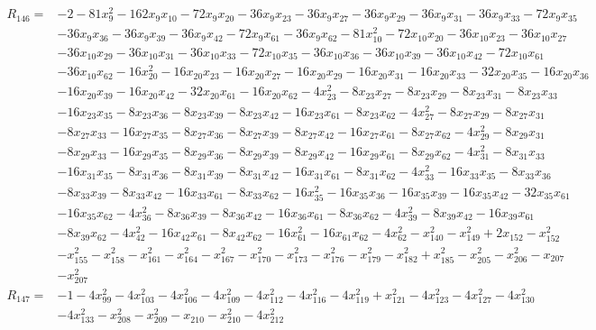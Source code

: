 \begin{align*}
R_{146}={}&-2-81x_{9}^{2}-162x_{9}x_{10}-72x_{9}x_{20}-36x_{9}x_{23}-36x_{9}x_{27}-36x_{9}x_{29}-36x_{9}x_{31}-36x_{9}x_{33}-72x_{9}x_{35}\\
{}&-36x_{9}x_{36}-36x_{9}x_{39}-36x_{9}x_{42}-72x_{9}x_{61}-36x_{9}x_{62}-81x_{10}^{2}-72x_{10}x_{20}-36x_{10}x_{23}-36x_{10}x_{27}\\
{}&-36x_{10}x_{29}-36x_{10}x_{31}-36x_{10}x_{33}-72x_{10}x_{35}-36x_{10}x_{36}-36x_{10}x_{39}-36x_{10}x_{42}-72x_{10}x_{61}\\
{}&-36x_{10}x_{62}-16x_{20}^{2}-16x_{20}x_{23}-16x_{20}x_{27}-16x_{20}x_{29}-16x_{20}x_{31}-16x_{20}x_{33}-32x_{20}x_{35}-16x_{20}x_{36}\\
{}&-16x_{20}x_{39}-16x_{20}x_{42}-32x_{20}x_{61}-16x_{20}x_{62}-4x_{23}^{2}-8x_{23}x_{27}-8x_{23}x_{29}-8x_{23}x_{31}-8x_{23}x_{33}\\
{}&-16x_{23}x_{35}-8x_{23}x_{36}-8x_{23}x_{39}-8x_{23}x_{42}-16x_{23}x_{61}-8x_{23}x_{62}-4x_{27}^{2}-8x_{27}x_{29}-8x_{27}x_{31}\\
{}&-8x_{27}x_{33}-16x_{27}x_{35}-8x_{27}x_{36}-8x_{27}x_{39}-8x_{27}x_{42}-16x_{27}x_{61}-8x_{27}x_{62}-4x_{29}^{2}-8x_{29}x_{31}\\
{}&-8x_{29}x_{33}-16x_{29}x_{35}-8x_{29}x_{36}-8x_{29}x_{39}-8x_{29}x_{42}-16x_{29}x_{61}-8x_{29}x_{62}-4x_{31}^{2}-8x_{31}x_{33}\\
{}&-16x_{31}x_{35}-8x_{31}x_{36}-8x_{31}x_{39}-8x_{31}x_{42}-16x_{31}x_{61}-8x_{31}x_{62}-4x_{33}^{2}-16x_{33}x_{35}-8x_{33}x_{36}\\
{}&-8x_{33}x_{39}-8x_{33}x_{42}-16x_{33}x_{61}-8x_{33}x_{62}-16x_{35}^{2}-16x_{35}x_{36}-16x_{35}x_{39}-16x_{35}x_{42}-32x_{35}x_{61}\\
{}&-16x_{35}x_{62}-4x_{36}^{2}-8x_{36}x_{39}-8x_{36}x_{42}-16x_{36}x_{61}-8x_{36}x_{62}-4x_{39}^{2}-8x_{39}x_{42}-16x_{39}x_{61}\\
{}&-8x_{39}x_{62}-4x_{42}^{2}-16x_{42}x_{61}-8x_{42}x_{62}-16x_{61}^{2}-16x_{61}x_{62}-4x_{62}^{2}-x_{140}^{2}-x_{149}^{2}+2x_{152}-x_{152}^{2}\\
{}&-x_{155}^{2}-x_{158}^{2}-x_{161}^{2}-x_{164}^{2}-x_{167}^{2}-x_{170}^{2}-x_{173}^{2}-x_{176}^{2}-x_{179}^{2}-x_{182}^{2}+x_{185}^{2}-x_{205}^{2}-x_{206}^{2}-x_{207}\\
{}&-x_{207}^{2}
\end{align*}
\begin{align*}
R_{147}={}&-1-4x_{99}^{2}-4x_{103}^{2}-4x_{106}^{2}-4x_{109}^{2}-4x_{112}^{2}-4x_{116}^{2}-4x_{119}^{2}+x_{121}^{2}-4x_{123}^{2}-4x_{127}^{2}-4x_{130}^{2}\\
{}&-4x_{133}^{2}-x_{208}^{2}-x_{209}^{2}-x_{210}-x_{210}^{2}-4x_{212}^{2}
\end{align*}

